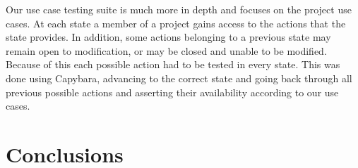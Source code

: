 \documentclass[document.tex]{subfiles}
\begin{document}
Our use case testing suite is much more in depth and focuses on the project use cases. At each state a member of a project gains access to the actions that the state provides. In addition, some actions belonging to a previous state may remain open to modification, or may be closed and unable to be modified. Because of this each possible action had to be tested in every state. This was done using Capybara, advancing to the correct state and going back through all previous possible actions and asserting their availability according to our use cases.


\section {Conclusions}

\end{document}
